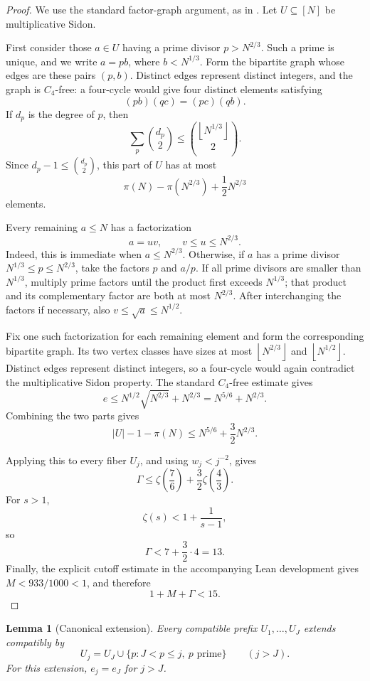\documentclass[11pt,reqno]{article}
\newtheorem{lemma}[theorem]{Lemma}
\theoremstyle{definition}
\newcommand{\floor}[1]{\left\lfloor #1\right\rfloor}
\begin{document}
\begin{proof}
We use the standard factor-graph argument, as in
\cite[Section~3.2]{LiuPach2019}.  Let \(U\subseteq[N]\) be
multiplicative Sidon.

First consider those \(a\in U\) having a prime divisor
\(p>N^{2/3}\).  Such a prime is unique, and we write \(a=pb\), where
\(b<N^{1/3}\).  Form the bipartite graph whose edges are these pairs
\((p,b)\).  Distinct edges represent distinct integers, and the graph is
\(C_4\)-free: a four-cycle would give four distinct elements satisfying
\[
  (pb)(qc)=(pc)(qb).
\]
If \(d_p\) is the degree of \(p\), then
\[
  \sum_p\binom{d_p}{2}
  \leq\binom{\floor{N^{1/3}}}{2}.
\]
Since \(d_p-1\leq\binom{d_p}{2}\), this part of \(U\) has at most
\[
  \pi(N)-\pi(N^{2/3})+\frac12N^{2/3}
\]
elements.

Every remaining \(a\leq N\) has a factorization
\[
  a=uv,\qquad v\leq u\leq N^{2/3}.
\]
Indeed, this is immediate when \(a\leq N^{2/3}\).  Otherwise, if \(a\)
has a prime divisor \(N^{1/3}\leq p\leq N^{2/3}\), take the factors \(p\) and
\(a/p\).  If all prime divisors are smaller than \(N^{1/3}\), multiply
prime factors until the product first exceeds \(N^{1/3}\); that product
and its complementary factor are both at most \(N^{2/3}\).  After
interchanging the factors if necessary, also
\(v\leq\sqrt a\leq N^{1/2}\).

Fix one such factorization for each remaining element and form the
corresponding bipartite graph.  Its two vertex classes have sizes at most
\(\floor{N^{2/3}}\) and \(\floor{N^{1/2}}\).  Distinct edges represent distinct
integers, so a four-cycle would again contradict the multiplicative
Sidon property.  The standard \(C_4\)-free estimate
\cite{KovariSosTuran1954} gives
\[
  e\leq N^{1/2}\sqrt{N^{2/3}}+N^{2/3}
    =N^{5/6}+N^{2/3}.
\]
Combining the two parts gives
\[
  |U|-1-\pi(N)
  \leq N^{5/6}+\frac32N^{2/3}.
\]

Applying this to every fiber \(U_j\), and using \(w_j<j^{-2}\), gives
\[
  \Gamma
  \leq\zeta\left(\frac76\right)
       +\frac32\zeta\left(\frac43\right).
\]
For \(s>1\),
\[
  \zeta(s)<1+\frac1{s-1},
\]
so
\[
  \Gamma<7+\frac32\cdot4=13.
\]
Finally, the explicit cutoff estimate in the accompanying Lean development
gives \(M<933/1000<1\), and therefore
\[
  1+M+\Gamma<15.
\]
\end{proof}

\begin{lemma}[Canonical extension]\label{lem:extension}
Every compatible prefix \(U_1,\ldots,U_J\) extends compatibly by
\[
  U_j=U_J\cup\{p:J<p\leq j,\ p\text{ prime}\}\qquad(j>J).
\]
For this extension, \(e_j=e_J\) for \(j>J\).
\end{lemma}
\end{document}
